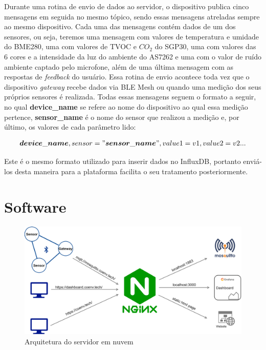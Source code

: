 \documentclass[../monografia.tex]{subfiles}
\begin{document}
Durante uma rotina de envio de dados ao servidor, o dispositivo publica cinco mensagens em seguida no mesmo tópico, sendo essas mensagens atreladas sempre ao mesmo dispositivo. Cada uma das mensagens contém dados de um dos sensores, ou seja, teremos uma mensagem com valores de temperatura e umidade do BME280, uma com valores de TVOC e $CO_{2}$ do SGP30, uma com valores das 6 cores e a intensidade da luz do ambiente do AS7262 e uma com o valor de ruído ambiente captado pelo microfone, além de uma última mensagem com as respostas de \textit{feedback} do usuário. Essa rotina de envio acontece toda vez que o dispositivo \textit{gateway} recebe dados via BLE Mesh ou quando uma medição dos seus próprios sensores é realizada. Todas essas mensagens seguem o formato a seguir, no qual \textbf{device\_name} se refere ao nome do dispositivo ao qual essa medição pertence, \textbf{sensor\_name} é o nome do sensor que realizou a medição e, por último, os valores de cada parâmetro lido:

\begin{align}
	\boldsymbol{device\_name},sensor="\boldsymbol{sensor\_name}", value1=v1,value2=v2 ... 
\end{align}

Este é o mesmo formato utilizado para inserir dados no InfluxDB, portanto enviá-los desta maneira para a plataforma facilita o seu tratamento posteriormente.


\section{Software}

\begin{figure}[h!]
	\centering
	\includegraphics[scale=0.16]{server-architecture.png}
	\caption{Arquitetura do servidor em nuvem}
	\label{fig:cloud-server-architecture}
\end{figure}
\end{document}
